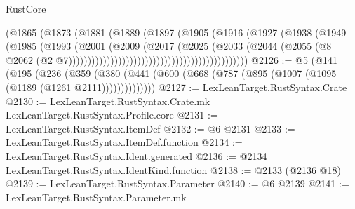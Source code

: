 \begin{lexlean}{RustCore}
\begin{coremodule}
                                                        (@1865
                                                          (@1873
                                                            (@1881
                                                              (@1889
                                                                (@1897
                                                                  (@1905
                                                                    (@1916
                                                                      (@1927
                                                                        (@1938
                                                                          (@1949
                                                                            (@1985
                                                                              (@1993
                                                                                (@2001
                                                                                  (@2009
                                                                                    (@2017
                                                                                      (@2025
                                                                                        (@2033
                                                                                          (@2044
                                                                                            (@2055
                                                                                              (@8
                                                                                                @2062
                                                                                                (@2
                                                                                                  @7)))))))))))))))))))))))))))))))))))))))))))))))
@2126 := @5
    (@141
      (@195
        (@236
          (@359 (@380 (@441 (@600 (@668 (@787 (@895 (@1007 (@1095 (@1189 (@1261 @2111))))))))))))))
@2127 := LexLeanTarget.RustSyntax.Crate
@2130 := LexLeanTarget.RustSyntax.Crate.mk LexLeanTarget.RustSyntax.Profile.core
@2131 := LexLeanTarget.RustSyntax.ItemDef
@2132 := @6 @2131
@2133 := LexLeanTarget.RustSyntax.ItemDef.function
@2134 := LexLeanTarget.RustSyntax.Ident.generated
@2136 := @2134 LexLeanTarget.RustSyntax.IdentKind.function
@2138 := @2133 (@2136 @18)
@2139 := LexLeanTarget.RustSyntax.Parameter
@2140 := @6 @2139
@2141 := LexLeanTarget.RustSyntax.Parameter.mk

\end{coremodule}
\end{lexlean}
